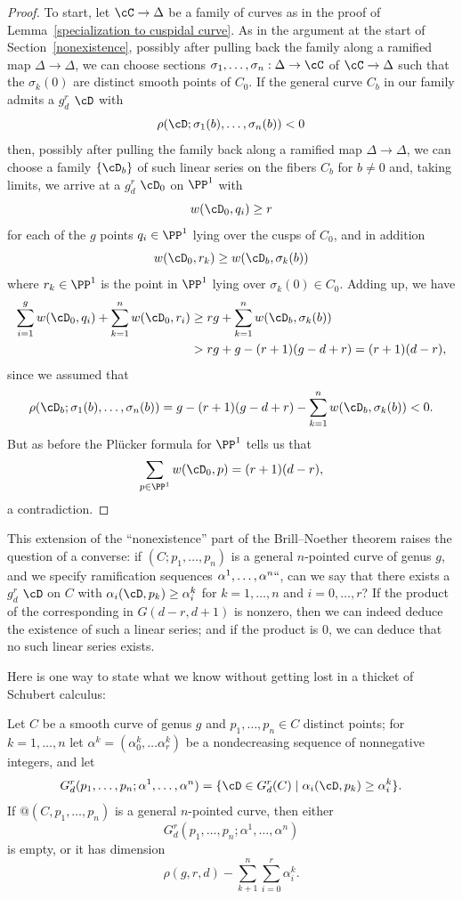 \begin{proof}
To start, let $\cC \to \Delta$ be a family of curves as in the proof of
Lemma~\ref{specialization to cuspidal curve}.
As in the argument
at the start of Section~\ref{nonexistence},
possibly
after pulling back the family along a ramified map $\Delta \to \Delta$,
we can choose sections $\sigma_1, \dots, \sigma_n : \Delta \to \cC$
of $\cC \to \Delta$ such that the $\sigma_k(0)$ are distinct smooth
points of $C_0$.
If the general curve $C_b$ in our family admits a $g^r_d$ $\cD$ with
$$
\rho(\cD;\sigma_1(b),\dots,\sigma_n(b)) < 0
$$
then, possibly after pulling the family back along a ramified map $\Delta
\to \Delta$, we can choose a family $\{\cD_b\}$ of such linear series
on the fibers $C_b$ for $b \neq 0$ and, taking limits, we arrive at a
$g^r_d$ $\cD_0$ on $\PP^1$ with
$$
w(\cD_0, q_i) \geq r
$$
for each of the $g$ points $q_i \in \PP^1$ lying over the cusps of $C_0$,
and in addition
$$
w(\cD_0, r_k) \geq w(\cD_b,\sigma_k(b))
$$
where $r_k \in \PP^1$ is the point in $\PP^1$ lying over $\sigma_k(0)
\in C_0$. Adding up, we have
\begin{align*}
\sum_{i=1}^g w(\cD_0, q_i) + \sum_{k=1}^n w(\cD_0, r_i) &\geq rg +
\sum_{k=1}^n w(\cD_b,\sigma_k(b)) \\
&> rg + g - (r+1)(g-d+r) = (r+1)(d-r)
,
\end{align*}
since we assumed that
$$
\rho(\cD_b;\sigma_1(b),\dots,\sigma_n(b)) = g - (r+1)(g-d+r) -
\sum_{k=1}^n w(\cD_b,\sigma_k(b)) < 0.
$$
But as before the Pl\"ucker formula for $\PP^1$ tells us that
$$
\sum_{p \in \PP^1} w(\cD_0, p) = (r+1)(d-r),
$$
a contradiction.
\end{proof}

This extension of the ``nonexistence'' part of
the Brill--Noether theorem
raises
the question of a converse: if $(C;p_1,\dots,p_n)$ is a general
$n$-pointed curve of genus $g$, and we specify ramification sequences
$\alpha^1, \dots, \alpha^n` `$, can we say that there exists a $g^r_d$
$\cD$ on $C$ with $\alpha_i(\cD, p_k) \geq \alpha^k_i$ for
$k=1,\dots,n$ and $i = 0, \dots, r$? If the product of the
corresponding
%
in $G(d-r, d+1)$ is nonzero, then we
can indeed deduce the existence of such a linear series; and if the
product is 0, we can deduce that no such linear series exists.

Here is one way to state what we know without getting lost in a thicket
of Schubert calculus:

\begin{theorem}\label{BN with inflection and dimension}
Let $C$ be a smooth curve of genus $g$ and $p_1,\dots,p_n \in C$ distinct
points; for $k = 1,\dots,n$ let $\alpha^k = (\alpha^k_0,\dots\alpha^k_r)$
be a nondecreasing sequence of nonnegative integers, and let
$$
G^r_d(p_1,\dots,p_n; \alpha^1,\dots,\alpha^n) = \{\cD \in G^r_d(C)
\mid \alpha_i(\cD, p_k) \geq \alpha^k_i \}.
$$
If $@(C, p_1,\dots,p_n)$ is a general $n$-pointed curve, 
then either
$$
G^r_d(p_1,\dots,p_n; \alpha^1,\dots,\alpha^n) 
$$
is empty, or it has dimension
$$
\rho(g,r,d) -
\sum_{k+1}^n \sum_{i=0}^r \alpha^k_i.
$$
\end{theorem}

